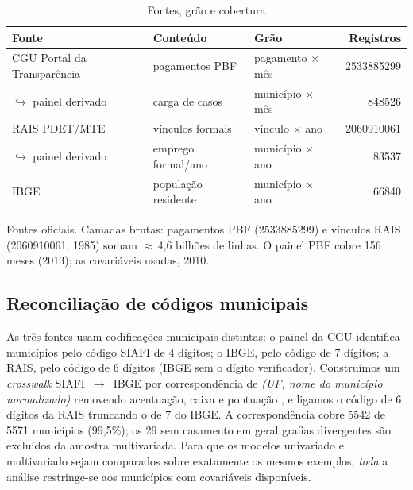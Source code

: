 \documentclass[12pt,a4paper,oneside]{article}
\begin{document}
\begin{table}[H]
\centering
\caption{Fontes, grão e cobertura}
\label{tab:dados}
\small
\begin{tabular}{@{}lllr@{}}
\toprule
\textbf{Fonte} & \textbf{Conteúdo} & \textbf{Grão} & \textbf{Registros} \\
\midrule
CGU \textendash{} Portal da Transparência & pagamentos PBF & pagamento $\times$ mês & \num{2533885299} \\
\quad$\hookrightarrow$ painel derivado     & carga de casos & município $\times$ mês & \num{848526} \\
RAIS \textendash{} PDET/MTE                 & vínculos formais & vínculo $\times$ ano & \num{2060910061} \\
\quad$\hookrightarrow$ painel derivado     & emprego formal/ano & município $\times$ ano & \num{83537} \\
IBGE                                       & população residente & município $\times$ ano & \num{66840} \\
\bottomrule
\end{tabular}
\par\smallskip
{\footnotesize Fontes oficiais. Camadas brutas: pagamentos PBF
(\num{2533885299}) e vínculos RAIS (\num{2060910061}, 1985)
somam $\approx$\,4,6 bilhões de linhas. O painel PBF cobre 156 meses
(2013); as covariáveis usadas, 2010.}
\end{table}

\subsection{Reconciliação de códigos municipais}

As três fontes usam codificações municipais distintas: o painel da CGU
identifica municípios pelo código SIAFI de 4 dígitos; o IBGE,
pelo código de 7 dígitos; a RAIS, pelo código de 6 dígitos (IBGE sem o
dígito verificador). Construímos um \emph{crosswalk} SIAFI~$\to$~IBGE por
correspondência de \emph{(UF, nome do município normalizado)} \textemdash{}
removendo acentuação, caixa e pontuação \textemdash{}, e ligamos o código
de 6 dígitos da RAIS truncando o de 7 do IBGE. A correspondência cobre
\num{5542} de \num{5571} municípios (99,5\%); os 29 sem casamento
\textemdash{} em geral grafias divergentes \textemdash{} são excluídos da
amostra multivariada. Para que os modelos univariado e multivariado sejam
comparados sobre exatamente os mesmos exemplos, \emph{toda} a análise
restringe-se aos municípios com covariáveis disponíveis.
\end{document}
